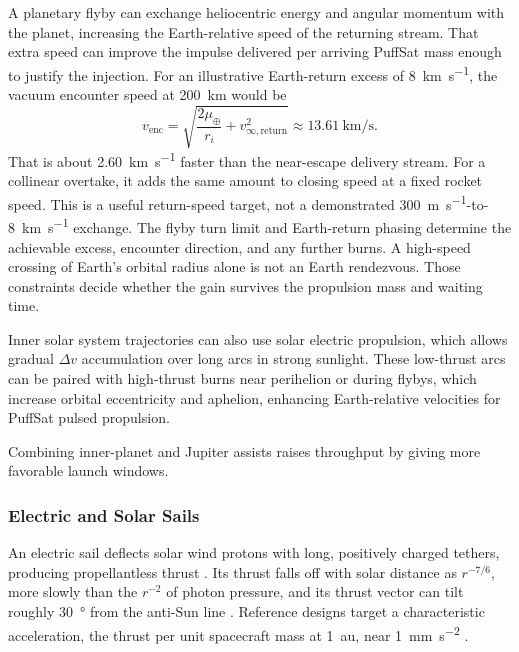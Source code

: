 \documentclass{article}
\newcommand{\deltav}{\Delta v}
\begin{document}
A planetary flyby can exchange heliocentric energy and angular momentum with the planet, increasing the Earth-relative speed of the returning stream. That extra speed can improve the impulse delivered per arriving PuffSat mass enough to justify the injection. For an illustrative Earth-return excess of \SI{8}{\kilo\meter\per\second}, the vacuum encounter speed at \SI{200}{\kilo\meter} would be
\begin{equation}
v_{\mathrm{enc}} = \sqrt{\frac{2\mu_\oplus}{r_i}+v_{\infty,\mathrm{return}}^2}
\approx \SI{13.61}{\kilo\meter\per\second}.
\end{equation}
That is about \SI{2.60}{\kilo\meter\per\second} faster than the near-escape delivery stream. For a collinear overtake, it adds the same amount to closing speed at a fixed rocket speed. This is a useful return-speed target, not a demonstrated \SI{300}{\meter\per\second}-to-\SI{8}{\kilo\meter\per\second} exchange. The flyby turn limit and Earth-return phasing determine the achievable excess, encounter direction, and any further burns. A high-speed crossing of Earth's orbital radius alone is not an Earth rendezvous. Those constraints decide whether the gain survives the propulsion mass and waiting time.

Inner solar system trajectories can also use solar electric propulsion, which allows gradual
$\deltav$ accumulation over long arcs in strong sunlight. These low-thrust arcs can be paired with high-thrust burns near perihelion or during flybys, which increase orbital eccentricity and aphelion, enhancing Earth-relative velocities for PuffSat pulsed propulsion.
 
Combining inner-planet and Jupiter assists raises throughput by giving more favorable launch windows.

\subsubsection{Electric and Solar Sails}\label{sec:esails}
An electric sail deflects solar wind protons with long, positively charged tethers, producing propellantless thrust \cite{janhunen2004esail}. Its thrust falls off with solar distance as $r^{-7/6}$, more slowly than the $r^{-2}$ of photon pressure, and its thrust vector can tilt roughly \SI{30}{\degree} from the anti-Sun line \cite{janhunen_sandroos2007_esail}. Reference designs target a characteristic acceleration, the thrust per unit spacecraft mass at \SI{1}{\astronomicalunit}, near \SI{1}{\milli\meter\per\second\squared} \cite{mengali2008esail}.
\end{document}
